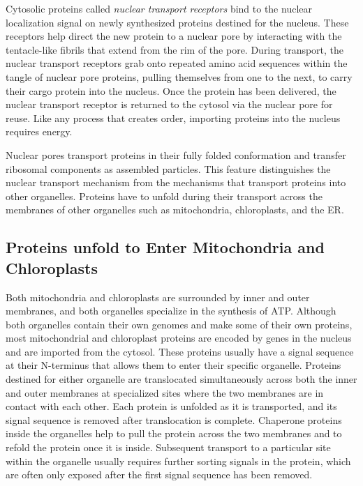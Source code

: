 Cytosolic proteins called \textit{nuclear transport receptors} bind to the nuclear
localization signal on newly synthesized proteins destined for the
nucleus. These receptors help direct the new protein to a nuclear pore
by interacting with the tentacle-like fibrils that extend from the rim of the
pore. During transport, the nuclear transport receptors grab
onto repeated amino acid sequences within the tangle of nuclear pore
proteins, pulling themselves from one to the next, to carry their cargo
protein into the nucleus. Once the protein has been delivered, the nuclear
transport receptor is returned to the cytosol via the nuclear pore for reuse.
Like any process that creates order, importing proteins
into the nucleus requires energy.

Nuclear pores transport proteins in their fully folded conformation and
transfer ribosomal components as assembled particles. This feature distinguishes 
the nuclear transport mechanism from the mechanisms that
transport proteins into other organelles. Proteins have to unfold during
their transport across the membranes of other organelles such as mitochondria, 
chloroplasts, and the ER.

\subsection{Proteins unfold to Enter Mitochondria and Chloroplasts}

Both mitochondria and chloroplasts are surrounded by inner and outer
membranes, and both organelles specialize in the synthesis of ATP.
Although both organelles contain their
own genomes and make some of their own proteins, most mitochondrial
and chloroplast proteins are encoded by genes in the nucleus and are
imported from the cytosol. These proteins usually have a signal sequence
at their N-terminus that allows them to enter their specific organelle.
Proteins destined for either organelle are translocated simultaneously
across both the inner and outer membranes at specialized sites where the
two membranes are in contact with each other. Each protein is unfolded
as it is transported, and its signal sequence is removed after translocation
is complete. Chaperone proteins
inside the organelles help to pull the protein across the two membranes
and to refold the protein once it is inside. Subsequent transport to a particular 
site within the organelle usually requires further sorting
signals in the protein, which are often only exposed after the first signal
sequence has been removed.

